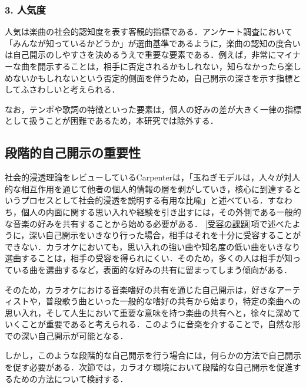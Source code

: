 \subsubsection{3. 人気度}
人気は楽曲の社会的認知度を表す客観的指標である．アンケート調査において「みんなが知っているかどうか」が選曲基準であるように，楽曲の認知の度合いは自己開示のしやすさを決めるうえで重要な要素である．例えば，非常にマイナーな曲を開示することは，相手に否定されるかもしれない，知らなかったら楽しめないかもしれないという否定的側面を伴うため，自己開示の深さを示す指標としてふさわしいと考えられる．

なお，テンポや歌詞の特徴といった要素は，個人の好みの差が大きく一律の指標として扱うことが困難であるため，本研究では除外する．


\subsection{段階的自己開示の重要性} %

社会的浸透理論をレビューしているCarpenter\cite{carpenter_2015_SPT_Review}は，「玉ねぎモデルは，人々が対人的な相互作用を通じて他者の個人的情報の層を剥がしていき，核心に到達するというプロセスとして社会的浸透を説明する有用な比喩」と述べている．すなわち，個人の内面に関する思い入れや経験を引き出すには，その外側である一般的な音楽の好みを共有することから始める必要がある．
\ref{受容の課題}項で述べたように，深い自己開示をいきなり行った場合，相手はそれを十分に受容することができない．カラオケにおいても，思い入れの強い曲や知名度の低い曲をいきなり選曲することは，相手の受容を得られにくい．そのため，多くの人は相手が知っている曲を選曲するなど，表面的な好みの共有に留まってしまう傾向がある．

そのため，カラオケにおける音楽嗜好の共有を通じた自己開示は，好きなアーティストや，普段歌う曲といった一般的な嗜好の共有から始まり，特定の楽曲への思い入れ，そして人生において重要な意味を持つ楽曲の共有へと，徐々に深めていくことが重要であると考えられる．このように音楽を介することで，自然な形での深い自己開示が可能となる．

しかし，このような段階的な自己開示を行う場合には，何らかの方法で自己開示を促す必要がある．次節では，カラオケ環境において段階的な自己開示を促進するための方法について検討する．